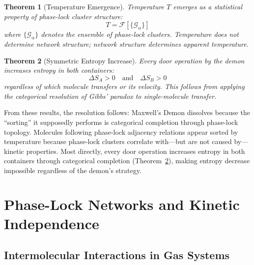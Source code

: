 \documentclass[12pt,a4paper]{article}
\newtheorem{theorem}{Theorem}[section]
\theoremstyle{definition}
\theoremstyle{remark}
\newcommand{\phaselockgraph}{\mathcal{G}}
\begin{document}
\begin{theorem}[Temperature Emergence]
\label{thm:temperature_emergence_intro}
Temperature $T$ emerges as a statistical property of phase-lock cluster structure:
\begin{equation}
T = \mathcal{F}[\{\phaselockgraph_\alpha\}]
\end{equation}
where $\{\phaselockgraph_\alpha\}$ denotes the ensemble of phase-lock clusters. Temperature does not determine network structure; network structure determines apparent temperature.
\end{theorem}

\begin{theorem}[Symmetric Entropy Increase]
\label{thm:symmetric_entropy_intro}
Every door operation by the demon increases entropy in both containers:
\begin{equation}
\Delta S_A > 0 \quad \text{and} \quad \Delta S_B > 0
\end{equation}
regardless of which molecule transfers or its velocity. This follows from applying the categorical resolution of Gibbs' paradox to single-molecule transfer.
\end{theorem}

From these results, the resolution follows: Maxwell's Demon dissolves because the ``sorting'' it supposedly performs is categorical completion through phase-lock topology. Molecules following phase-lock adjacency relations appear sorted by temperature because phase-lock clusters correlate with---but are not caused by---kinetic properties. Most directly, every door operation increases entropy in both containers through categorical completion (Theorem~\ref{thm:symmetric_entropy_intro}), making entropy decrease impossible regardless of the demon's strategy.


\section{Phase-Lock Networks and Kinetic Independence}
\label{sec:phase_lock}

\subsection{Intermolecular Interactions in Gas Systems}
\end{document}
